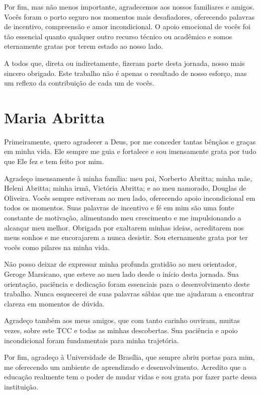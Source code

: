 \begin{agradecimentos}
Por fim, mas não menos importante, agradecemos aos nossos familiares e amigos. Vocês foram o porto seguro nos momentos mais desafiadores, oferecendo palavras de incentivo, compreensão e amor incondicional. O apoio emocional de vocês foi tão essencial quanto qualquer outro recurso técnico ou acadêmico e somos eternamente gratas por terem estado ao nosso lado.

A todos que, direta ou indiretamente, fizeram parte desta jornada, nosso mais sincero obrigado. Este trabalho não é apenas o resultado de nosso esforço, mas um reflexo da contribuição de cada um de vocês.

\section{Maria Abritta}

Primeiramente, quero agradecer a Deus, por me conceder tantas bênçãos e graças em minha vida. Ele sempre me guia e fortalece e sou imensamente grata por tudo que Ele fez e tem feito por mim.

Agradeço imensamente à minha família: meu pai, Norberto Abritta; minha mãe, Heleni Abritta; minha irmã, Victória Abritta; e ao meu namorado, Douglas de Oliveira. Vocês sempre estiveram ao meu lado, oferecendo apoio incondicional em todos os momentos. Suas palavras de incentivo e fé em mim são uma fonte constante de motivação, alimentando meu crescimento e me impulsionando a alcançar meu melhor. Obrigada por exaltarem minhas ideias, acreditarem nos meus sonhos e me encorajarem a nunca desistir. Sou eternamente grata por ter vocês como pilares na minha vida.

Não posso deixar de expressar minha profunda gratidão ao meu orientador, Geroge Marsicano, que esteve ao meu lado desde o início desta jornada. Sua orientação, paciência e dedicação foram essenciais para o desenvolvimento deste trabalho. Nunca esquecerei de suas palavras sábias que me ajudaram a encontrar clareza em momentos de dúvida.

Agradeço também aos meus amigos, que com tanto carinho ouviram, muitas vezes, sobre este TCC e todas as minhas descobertas. Sua paciência e apoio incondicional foram fundamentais para minha trajetória.

Por fim, agradeço à Universidade de Brasília, que sempre abriu portas para mim, me oferecendo um ambiente de aprendizado e desenvolvimento. Acredito que a educação realmente tem o poder de mudar vidas e sou grata por fazer parte dessa instituição.

\end{agradecimentos}
